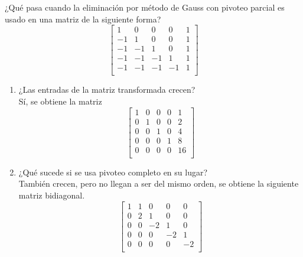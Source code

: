 \documentclass[paper=letter, fontsize=11pt]{scrartcl}
\numberwithin{equation}{section} %
\numberwithin{figure}{section} %
\numberwithin{table}{section} %
\newenvironment{cframed}[1][blue]
  {\begin{tcolorbox}[colframe=#1,colback=white]}
  {\end{tcolorbox}}
\begin{document}
\begin{enumerate}
\begin{cframed}[green]
\item ¿Qué pasa cuando la eliminación por método de Gauss con pivoteo parcial es usado en una matriz de la siguiente forma?
\[
\begin{bmatrix}
1 & 0& 0 & 0 & 1   \\
-1 & 1& 0& 0 & 1\\
-1 & -1& 1& 0 & 1\\
-1 & -1 & -1 & 1 & 1 \\
-1 & -1 & -1 & -1 & 1\\
\end{bmatrix}
\]
\end{cframed}
\begin{enumerate}
\item ¿Las entradas de la matriz transformada crecen?\\
Sí, se obtiene la matriz 
\[
\begin{bmatrix}
1 & 0& 0 & 0 & 1   \\
0 & 1& 0& 0 & 2\\
0 & 0& 1& 0 & 4\\
0 & 0 & 0 & 1 & 8 \\
 0& 0 & 0 & 0 & 16\\
\end{bmatrix}
\]

\item ¿Qué sucede si se usa pivoteo completo en su lugar? \\
También crecen, pero no llegan a ser del mismo orden, se obtiene la siguiente matriz bidiagonal.
\[
\begin{bmatrix}
1 & 1& 0 & 0 & 0   \\
0 & 2& 1& 0 & 0\\
0 & 0& -2& 1 & 0\\
0 & 0 & 0 & -2 & 1 \\
 0& 0 & 0 & 0 & -2\\
\end{bmatrix}
\]

\end{enumerate}









\end{enumerate}
\end{document}
